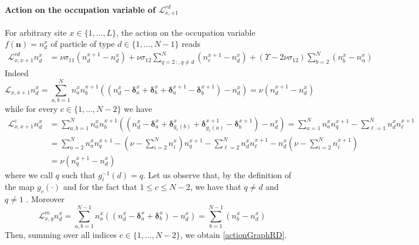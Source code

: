 \documentclass[10pt]{article}
\numberwithin{equation}{section}
\numberwithin{equation}{subsection}
\begin{document}
\paragraph{Action on the occupation variable of $\mathcal{L}_{x,+1}^{rd}$}
For arbitrary site $x\in \{1,\ldots,L\}$, the action on the occupation variable $f(\bm{n})=n_{d}^{x}$ of particle of type $d\in \{1,\ldots,N-1\}$ reads
\begin{equation}\label{actionGraphRD}
	\begin{split}
		\mathcal{L}_{x,x+1}^{rd}n_{d}^{x}&=\nu \sigma_{11}(n_{d}^{x+1}-n_{d}^{x})+\nu\sigma_{12}\sum_{q=2\,:	,q\neq d}^{N}(n_{c}^{x+1}-n_{d}^{x})+(\Upsilon-2\nu\sigma_{12})\sum_{b=2}^{N}(n_{b}^{x}-n_{\alpha}^{x})
	\end{split}
\end{equation}
Indeed
\begin{equation}
	\mathcal{L}_{x,x+1}n_{d}^{x}=\sum_{a,b=1}^{N}n_{a}^{x}n_{b}^{x+1}\left((n_{d}^{x}-\bm{\delta}_{a}^{x}+\bm{\delta}_{b}^{x}+\bm{\delta}_{a}^{x+1}-\bm{\delta}_{b}^{x+1})-n_{d}^{x}\right)=\nu\left(n_{d}^{x+1}-n_{d}^{x}\right)
\end{equation}
while for every $c\in \{1,\ldots,N-2\}$ we have 
\begin{equation}
	\begin{split}
		\mathcal{L}_{x,x+1}^{c}n_{d}^{x}&=\sum_{a,b=1}^{N}n_{a}^{x}n_{b}^{x+1}\left((n_{d}^{x}-\bm{\delta}_{a}^{x}+\bm{\delta}_{g_{c}(b)}^{x}+\bm{\delta}_{g_{c}(a)}^{x+1}-\bm{\delta}_{b}^{x+1})-n_{d}^{x}\right)=\sum_{a=1}^{N}n_{a}^{x}n_{q}^{x+1}-\sum_{\ell=1}^{N}n_{d}^{x}n_{\ell}^{x+1}
		\\&=
		\sum_{a=2}^{N}n_{a}^{x}n_{q}^{x+1}-\left(\nu-\sum_{i=2}^{N}n_{i}^{x}\right)n_{q}^{x+1}-\sum_{\ell=2}^{N}n_{d}^{x}n_{\ell}^{x+1}-n_{d}^{x}\left(\nu-\sum_{i=2}^{N}n_{i}^{x+1}\right)
		\\&=
		\nu(n_{q}^{x+1}-n_{d}^{x})
	\end{split}
\end{equation}
where we call $q$ such that $g_{i}^{-1}(d)=q$. Let us observe that, by the definition of the map $g_{c}(\cdot)$ and for the fact that $1\leq c\leq N-2$, we have that $q\neq d$ and $q\neq 1$ .
Moreover
\begin{equation}
	\mathcal{L}_{x,y}^{m}n_{d}^{x}=\sum_{a,b=1}^{N-1}n_{a}^{x}\left((n_{d}^{x}-\bm{\delta}_{a}^{x}+\bm{\delta}_{b}^{x})-n_{d}^{x}\right)=\sum_{b=1}^{N-1}(n_{b}^{x}-n_{d}^{x})
\end{equation}
Then, summing over all indices $c\in\{1,\ldots,N-2\}$, we obtain \eqref{actionGraphRD}.
\end{document}
